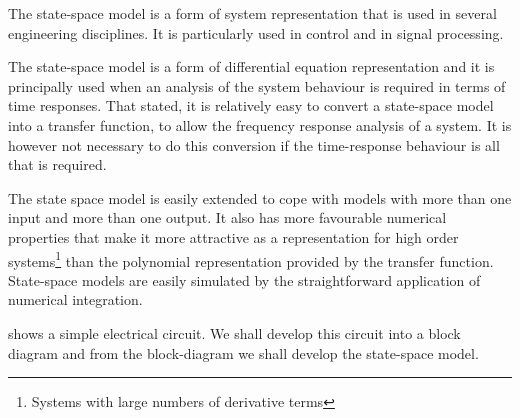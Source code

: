 \def\FileDate{9/9/29}
\def\FileVersion{1.1}
The state-space model is a form of system representation that is used
in several engineering disciplines. It is particularly used in control
and in signal processing.

The state-space model is a form of differential equation
representation and it is principally used when an analysis of the
system behaviour is required in terms of time responses. That
stated, it is relatively easy to convert a state-space model into
a transfer function, to allow the frequency response analysis of a
system. It is however not necessary to do this conversion if the
time-response behaviour is all that is required.

The state space model is easily extended to cope with models with more
than one input and more than one output. It also has more favourable
numerical properties that make it more attractive as a representation
for high order systems\footnote{Systems with large numbers of
  derivative terms} than the polynomial representation provided by the
transfer function. State-space models are easily simulated by the
straightforward application of numerical integration.

 shows a simple electrical circuit. We shall develop
this circuit into a block diagram and from the block-diagram we shall
develop the state-space model.

\begin{slide}\label{slide:l1s1}
\begin{center}
\end{center}
\end{slide}


